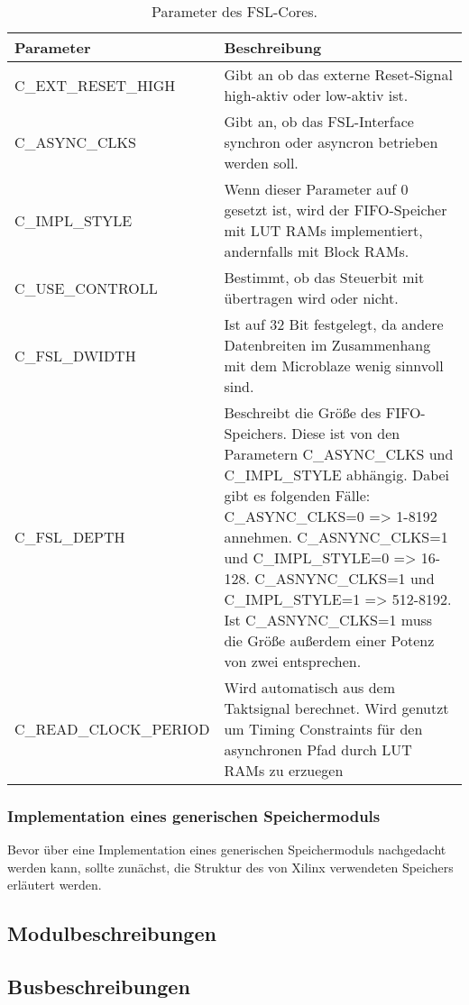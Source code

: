 \begin{table}[ht!]
	\begin{tabular}{|l|p{10cm}|}
		\hline \textbf{Parameter} & \textbf{Beschreibung} \\ 
		\hline C\_EXT\_RESET\_HIGH & Gibt an ob das externe Reset-Signal high-aktiv oder low-aktiv ist.\\ 
		\hline C\_ASYNC\_CLKS & Gibt an, ob das FSL-Interface synchron oder asyncron betrieben werden soll.\\ 
		\hline C\_IMPL\_STYLE & Wenn dieser Parameter auf 0 gesetzt ist, wird der FIFO-Speicher mit LUT RAMs implementiert, andernfalls mit Block RAMs.   \\ 
		\hline C\_USE\_CONTROLL & Bestimmt, ob das Steuerbit mit übertragen wird oder nicht.\\ 
		\hline C\_FSL\_DWIDTH & Ist auf 32 Bit festgelegt, da andere Datenbreiten im Zusammenhang mit dem Microblaze wenig sinnvoll sind. \\ 
		\hline C\_FSL\_DEPTH & Beschreibt die Größe des FIFO-Speichers. Diese ist von den Parametern C\_ASYNC\_CLKS und C\_IMPL\_STYLE abhängig. Dabei gibt es folgenden Fälle: C\_ASYNC\_CLKS=0 => 1-8192 annehmen. C\_ASNYNC\_CLKS=1 und C\_IMPL\_STYLE=0 => 16-128. C\_ASNYNC\_CLKS=1 und C\_IMPL\_STYLE=1 => 512-8192. Ist C\_ASNYNC\_CLKS=1 muss die Größe außerdem einer Potenz von zwei entsprechen.\\ 
		\hline C\_READ\_CLOCK\_PERIOD & Wird automatisch aus dem Taktsignal berechnet. Wird genutzt um Timing Constraints für den asynchronen Pfad durch LUT RAMs zu erzuegen \\
		\hline 
	\end{tabular}
	\centering
	\caption{Parameter des FSL-Cores.}
	\label{tab:FSLParam}
\end{table}

\subsubsection{Implementation eines generischen Speichermoduls} \label{subsubsec:genMem}
Bevor über eine Implementation eines generischen Speichermoduls nachgedacht werden kann, sollte zunächst, die Struktur des von Xilinx verwendeten Speichers erläutert werden.

\subsection{Modulbeschreibungen}

\subsection{Busbeschreibungen}

